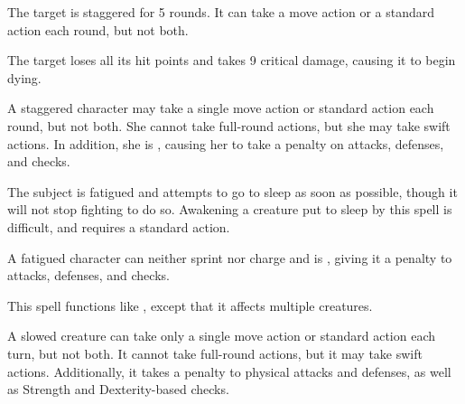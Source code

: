 \begin{spellhealthy}
    The target is staggered for 5 rounds. It can take a move action or a standard action each round, but not both.
\end{spellhealthy}
\begin{spellblood}
    The target loses all its hit points and takes 9 critical damage, causing it to begin dying.
\end{spellblood}
\begin{spellnotes}
    A staggered character may take a single move action or standard action each round, but not both. She cannot take full-round actions, but she may take swift actions. In addition, she is \vulnerable, causing her to take a  penalty on attacks, defenses, and checks.
\end{spellnotes}

\spelldur{\durshort}
\begin{spelleffect}
    The subject is fatigued and attempts to go to sleep as soon as possible, though it will not stop fighting to do so. Awakening a creature put to sleep by this spell is difficult, and requires a standard action.
\end{spelleffect}
\begin{spellnotes}
    A fatigued character can neither sprint nor charge and is \vulnerable, giving it a  penalty to attacks, defenses, and checks.
\end{spellnotes}

\begin{spelleffect}
    This spell functions like , except that it affects multiple creatures.
\end{spelleffect}

\spelldur{\durshort}
\begin{spelleffect}
    A slowed creature can take only a single move action or standard action each turn, but not both. It cannot take full-round actions, but it may take swift actions. Additionally, it takes a  penalty to physical attacks and defenses, as well as Strength and Dexterity-based checks.
\end{spelleffect}

